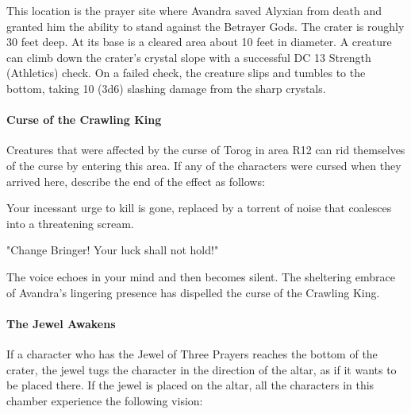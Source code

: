 \documentclass[10pt,a4paper,twoside,bg=print,twocolumn,openany,nodeprecatedcode]{dndbook}
\begin{document}
This location is the prayer site where Avandra saved Alyxian from death and granted him the ability to stand against the Betrayer Gods. The crater is roughly 30 feet deep. At its base is a cleared area about 10 feet in diameter. A creature can climb down the crater's crystal slope with a successful DC 13 Strength (Athletics) check. On a failed check, the creature slips and tumbles to the bottom, taking 10 (3d6) slashing damage from the sharp crystals.

\paragraph{Curse of the Crawling King}
Creatures that were affected by the curse of Torog in area R12 can rid themselves of the curse by entering this area. If any of the characters were cursed when they arrived here, describe the end of the effect as follows:

\begin{DndReadAloud}{}
Your incessant urge to kill is gone, replaced by a torrent of noise that coalesces into a threatening scream.

"Change Bringer! Your luck shall not hold!"

The voice echoes in your mind and then becomes silent. The sheltering embrace of Avandra's lingering presence has dispelled the curse of the Crawling King.

\end{DndReadAloud}

\paragraph{The Jewel Awakens}
If a character who has the Jewel of Three Prayers reaches the bottom of the crater, the jewel tugs the character in the direction of the altar, as if it wants to be placed there. If the jewel is placed on the altar, all the characters in this chamber experience the following vision:
\end{document}
